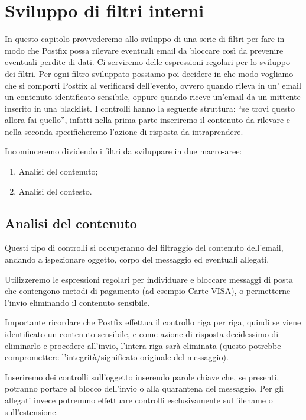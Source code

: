     \section{Sviluppo di filtri interni}
    In questo capitolo provvederemo allo sviluppo di una serie di filtri per fare in modo che Postfix possa 
    rilevare eventuali email da bloccare così da prevenire eventuali perdite di dati. 
    Ci serviremo delle espressioni regolari per lo sviluppo dei filtri. Per ogni filtro sviluppato possiamo 
    poi decidere in che modo vogliamo che si comporti Postfix al verificarsi dell’evento, 
    ovvero quando rileva in un’ email un contenuto identificato sensibile, oppure quando riceve un’email da un 
    mittente inserito in una blacklist.
    I controlli hanno la seguente struttura: “se trovi questo allora fai quello”, 
    infatti nella prima parte inseriremo il contenuto da rilevare e nella seconda specificheremo l’azione di 
    risposta da intraprendere.

    Incominceremo dividendo i filtri da sviluppare in due macro-aree:

    \begin{enumerate}
        \item Analisi del contenuto;
        \item Analisi del contesto.
    \end{enumerate}

    \subsection{Analisi del contenuto}
    Questi tipo di controlli si occuperanno del filtraggio del contenuto dell'email, 
    andando a ispezionare oggetto, corpo del messaggio ed eventuali allegati. 
    
    Utilizzeremo le espressioni regolari per individuare e bloccare messaggi di posta che contengono metodi di 
    pagamento (ad esempio Carte VISA), o permetterne l’invio eliminando il contenuto sensibile. 
    
    Importante ricordare che Postfix effettua il controllo riga per riga, quindi se viene identificato un 
    contenuto sensibile, e come azione di risposta decidessimo di eliminarlo e procedere all’invio, 
    l’intera riga sarà eliminata (questo potrebbe compromettere l’integrità/significato originale del messaggio). 
    
    Inseriremo dei controlli sull’oggetto inserendo parole chiave che, se presenti, 
    potranno portare al blocco dell’invio o alla quarantena del messaggio. Per gli allegati invece potremmo 
    effettuare controlli esclusivamente sul filename o sull’estensione. 

